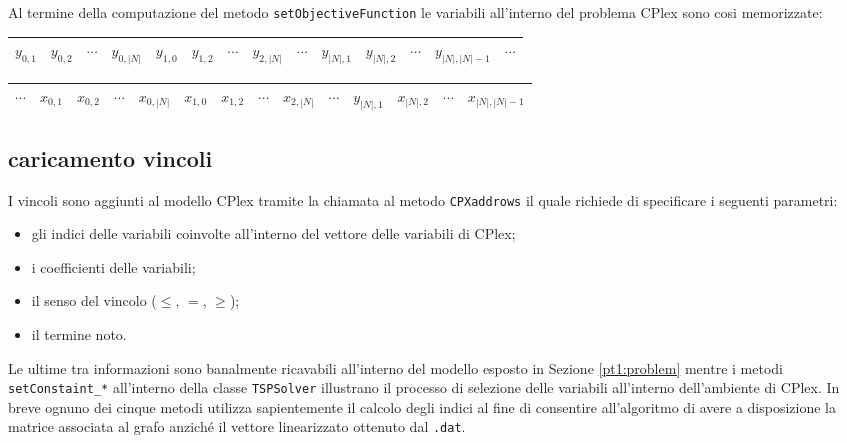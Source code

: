 Al termine della computazione del metodo \texttt{setObjectiveFunction} le variabili all'interno del problema CPlex sono cosi memorizzate:

\begin{tabular}{|c|c|c|c|c|c|c|c|c|c|c|c|c|c}
\hline 
$y_{0,1}$ & $y_{0,2}$ & $\cdots$ & $y_{0,\left|N\right|}$ & $y_{1,0}$ & $y_{1,2}$ & $ \cdots $ & $y_{2,\left|N\right|}$ & $\cdots$ & $y_{\left|N\right|,1}$ & $y_{\left|N\right|,2}$ & $\cdots$ & $y_{\left|N\right|,\left|N\right| - 1}$ & $\cdots$\\ 
\hline 
\end{tabular}

\begin{tabular}{c|c|c|c|c|c|c|c|c|c|c|c|c|c|}
\hline 
$\cdots$ & $x_{0,1}$ & $x_{0,2}$ & $\cdots$ & $x_{0,\left|N\right|}$ & $x_{1,0}$ & $x_{1,2}$ & $ \cdots $ & $x_{2,\left|N\right|}$ & $\cdots$ & $y_{\left|N\right|,1}$ & $x_{\left|N\right|,2}$ & $\cdots$ & $x_{\left|N\right|,\left|N\right| - 1}$\\ 
\hline 
\end{tabular}  

\subsection[Caricamento vincoli]{caricamento vincoli}
\label{pt1:solver:constraint}
I vincoli sono aggiunti al modello CPlex tramite la chiamata al metodo \texttt{CPXaddrows} il quale richiede di specificare i seguenti parametri:

\begin{itemize}
\item gli indici delle variabili coinvolte all'interno del vettore delle variabili di CPlex;
\item i coefficienti delle variabili;
\item il senso del vincolo ($\le$, $=$, $\ge$);
\item il termine noto.
\end{itemize}

Le ultime tra informazioni sono banalmente ricavabili all'interno del modello esposto in Sezione \ref{pt1:problem} mentre i metodi \texttt{setConstaint\_*} all'interno della classe \texttt{TSPSolver} illustrano il processo di selezione delle variabili all'interno dell'ambiente di CPlex. In breve ognuno dei cinque metodi utilizza sapientemente il calcolo degli indici al fine di consentire all'algoritmo di avere a disposizione la matrice associata al grafo anziché il vettore linearizzato ottenuto dal  \texttt{.dat}.

